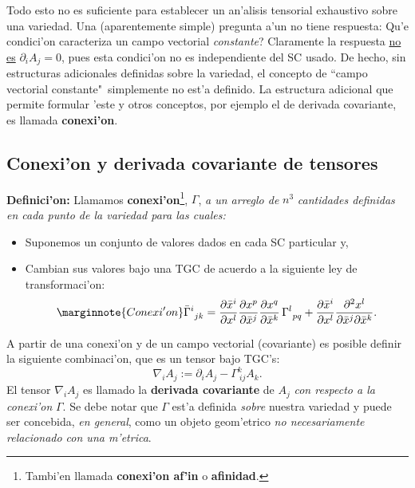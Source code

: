 Todo esto no es suficiente para establecer un an'alisis tensorial
exhaustivo sobre una variedad. Una (aparentemente simple) pregunta a'un no tiene respuesta: \textquestiondown Qu'e condici'on caracteriza un campo vectorial
\textit{constante}? Claramente la respuesta \underline{no es}
$\partial_iA_j=0$, pues esta condici'on no es independiente del SC usado. De hecho, sin estructuras adicionales definidas sobre la variedad, el concepto de ``campo vectorial constante"\, simplemente no est'a definido. La estructura adicional que permite formular 'este y otros conceptos, por ejemplo el de derivada covariante, es llamada \textbf{conexi'on}.

\subsection{Conexi'on y derivada covariante de tensores}

\textbf{Definici'on:} Llamamos \textbf{conexi'on}\footnote{Tambi'en llamada \textbf{conexi'on af'in} o \textbf{afinidad}.}, $\Gamma$, \textit{a un arreglo de} $n^3$ \textit{cantidades definidas en cada punto de la variedad para las cuales:}
\begin{itemize}
\item Suponemos un conjunto de valores dados en cada SC particular y,
\item Cambian sus valores bajo una TGC de acuerdo a la siguiente ley de transformaci'on:
\begin{equation}\marginnote{Conexi'on}
\bar{\Gamma}_{\ jk}^i=\frac{\partial\bar{x}^i}{\partial x^l }\frac{\partial
x^p}{\partial\bar{x}^j }\frac{\partial x^q}{\partial\bar{x}^k }\,
\Gamma_{\ pq}^l +\frac{\partial\bar{x}^i}{\partial x^l }\frac{\partial
^2x^l }{\partial\bar{x}^j \partial\bar{x}^k }. \label{dinv72}
\end{equation}
\end{itemize}
A partir de una conexi'on y de un campo vectorial (covariante) es posible definir la siguiente combinaci'on, que es un tensor bajo TGC's:
\begin{equation}
\boxed{\nabla_iA_j:=\partial_iA_j-\Gamma_{\ ij}^kA_k.}
\label{dinv6}
\end{equation}
El tensor $\nabla_iA_j$ es llamado la \textbf{derivada covariante} de $A_j$ \textit{con respecto a la conexi'on} $\Gamma$. Se debe notar que $\Gamma$ est'a definida \textit{sobre} nuestra variedad y puede ser concebida,\textit{ en general}, como un objeto geom'etrico \textit{no necesariamente relacionado con una  m'etrica}.



